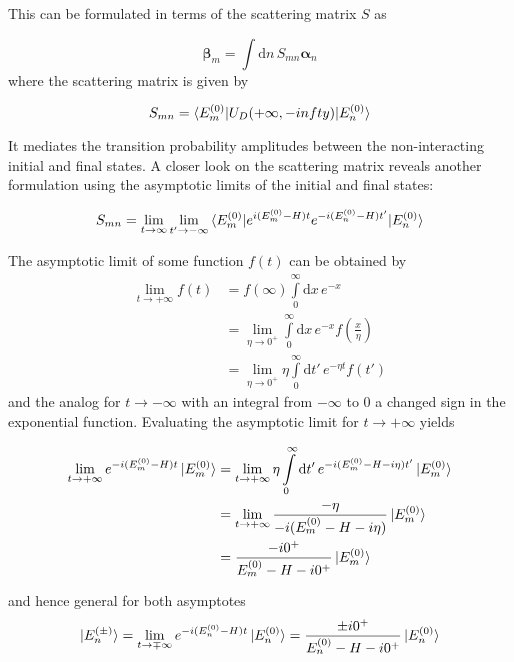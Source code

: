 This can be formulated in terms of the scattering matrix $S$ as

\begin{equation}
  \mathbf{\beta}_m = \int \mathrm{d} n \, S_{mn} \mathbf{\alpha}_n
\end{equation}
where the scattering matrix is given by

\begin{equation}
  S_{mn} = \braket{E_m^{(0)}| U_D(+\infty,-infty) |E_n^{(0)}}
\end{equation}

It mediates the transition probability amplitudes between the non-interacting
initial and final states. A closer look on the scattering matrix reveals another
formulation using the asymptotic limits of the initial and final states:

\begin{equation}
 S_{mn} = \lim_{t \to \infty} \lim_{t' \to -\infty}
  \braket{E_m^{(0)}| e^{i(E_m^{(0)}-H)t} e^{-i(E_n^{(0)}-H)t'} |E_n^{(0)}}
\end{equation}

The asymptotic limit of some function $f(t)$ can be obtained by
\begin{align}
 \lim_{t \to +\infty} f(t) &= f(\infty) \int\limits_0^\infty \mathrm{d}x \, e^{-x}\\
   &= \lim_{\eta \to 0^+} \int\limits_0^\infty \mathrm{d}x \, e^{-x}
           f\left( \frac{x}{\eta}\right)    \\
   &= \lim_{\eta \to 0^+} \eta \int\limits_0^\infty \mathrm{d}t' \, e^{-\eta t} f(t')
\end{align}
and the analog for $t \rightarrow -\infty$ with an integral from $-\infty$ to $0$
a changed sign in the exponential function.
Evaluating the asymptotic limit for $t\rightarrow +\infty$ yields

\begin{align}
 \lim_{t \to +\infty} e^{-i(E_m^{(0)}-H)t} \ket{E_m^{(0)}}
 &= \lim_{t \to +\infty} \eta \int\limits_0^\infty \mathrm{d}t' \,
    e^{-i(E_m^{(0)} -H -i\eta)t'} \ket{E_m^{(0)}}\\
 &= \lim_{t \to +\infty} \frac{-\eta}{-i(E_m^{(0)}-H -i\eta)} \ket{E_m^{(0)}}\\
 &= \frac{-i0^+}{E_m^{(0)}-H -i0^+}  \ket{E_m^{(0)}}
\end{align}

and hence general for both asymptotes
\begin{equation} \label{equation:asymptot_wf_scattering}
 \ket{E_n^{(\pm)}} = \lim_{t \to \mp\infty} e^{-i(E_n^{(0)}-H)t} \ket{E_n^{(0)}}
   = \frac{\pm i0^+}{E_n^{(0)}-H -i0^+} \ket{E_n^{(0)}}
\end{equation}

